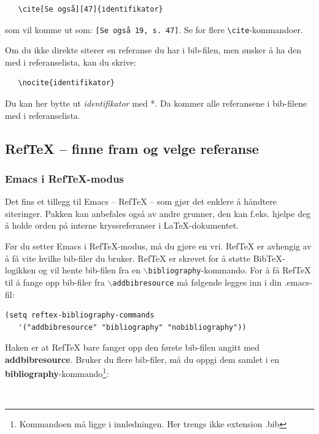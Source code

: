 \documentclass[11pt,norsk,a4paper]{article}
\newcommand{\kdo}[1]{\texttt{#1}}
\newcommand{\bt}{BibTeX{}}
\begin{document}
{\footnotesize\begin{verbatim}
   \cite[Se også][47]{identifikator}
\end{verbatim}}

\noindent{}som vil komme ut som: \verb=[Se også 19, s. 47]=. Se \cite[][13]{langmyhr13} for flere \verb=\cite=-kommandoer.

Om du ikke direkte siterer en referanse du har i bib-filen,
men ønsker å ha den med i referanselista, kan du skrive:

{\footnotesize\begin{verbatim}
   \nocite{identifikator}
\end{verbatim}}

\noindent Du kan her bytte ut \textit{identifikator} med *. Da kommer alle
referansene i bib-filene med i referanselista.

\subsection{RefTeX -- finne fram og velge referanse}
\subsubsection*{Emacs i RefTeX-modus}
Det fins et tillegg til Emacs -- RefTeX -- som gjør det enklere å
håndtere siteringer\cite{reftex}. Pakken kan anbefales også av andre
grunner, den kan f.eks. hjelpe deg å holde orden på interne
kryssreferanser i \LaTeX-dokumentet.

Før du setter Emacs i RefTeX-modus, må du gjøre en vri. RefTeX er
avhengig av å få vite hvilke bib-filer du bruker. RefTeX er skrevet
for å støtte \bt-logikken og vil hente bib-filen fra en
\kdo{$\backslash$bibliography}-kommando. For å få RefTeX til å fange
opp bib-filer fra \kdo{$\backslash$addbibresource} må følgende legges
inn i din .emacs-fil:

{\footnotesize\begin{verbatim}
(setq reftex-bibliography-commands 
   '("addbibresource" "bibliography" "nobibliography")) 
\end{verbatim}}

Haken er at RefTeX bare fanger opp den første bib-filen angitt med
\textbf{addbibresource}. Bruker du flere bib-filer, må du oppgi dem
samlet i en \textbf{bibliography}-kommando\footnote{Kommandoen må
  ligge i innledningen. Her trengs ikke
  extension .bib}:

{\footnotesize\begin{verbatim}
      
\end{verbatim}}
\end{document}
